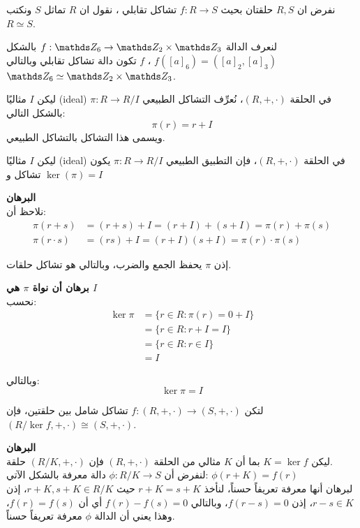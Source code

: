\begin{definition}
	نفرض ان $R, S$ حلقتان بحيث $f:R\to S$ تشاكل تقابلي ، نقول ان $R$ تماثل $S$ ونكتب $R\simeq S$.
\end{definition}

\begin{example}
لنعرف الدالة 
$f : \Z_6\to \Z_2\times \Z_3$ بالشكل 
$f([a]_6) = ([a]_2, [a]_3)$ ، $f$ تكون دالة تشاكل تقابلي وبالتالي $\Z_6 \simeq\Z_2\times \Z_3$.
\end{example}

\begin{definition}
	ليكن $I$ مثاليًا (ideal) في الحلقة $(R, +, \cdot)$، نُعرِّف التشاكل الطبيعي 
	$\pi : R \to R/I$ بالشكل التالي:
	\[
	\pi(r) = r + I
	\]
	ويسمى هذا التشاكل {بالتشاكل الطبيعي}.
\end{definition}
\begin{theorem}
	ليكن $I$ مثاليًا (ideal) في الحلقة $(R, +, \cdot)$، فإن التطبيق الطبيعي 
$\pi : R \to R/I$ 
يكون تشاكل و 
$\ker(\pi) = I$
\end{theorem}
\noindent
\textbf{البرهان}\\
\noindent
نلاحظ أن:
\begin{align*}
	\pi(r + s) &= (r + s) + I = (r + I) + (s + I) = \pi(r) + \pi(s)\\
	\pi(r \cdot s) &= (rs) + I = (r + I)(s + I) = \pi(r) \cdot \pi(s)
\end{align*}

إذن $\pi$ يحفظ الجمع والضرب، وبالتالي هو تشاكل حلقات.

\bigskip

\noindent
\textbf{برهان أن نواة $\pi$ هي $I$}\\
\noindent
نحسب:
\begin{align*}
	\ker \pi &= \{r \in R : \pi(r) = 0 + I\}\\
	&= \{r \in R : r + I = I\}\\
	&= \{r \in R : r \in I\}\\
	&= I
\end{align*}

وبالتالي:
\[
\ker \pi = I
\]


\begin{theorem}
	لتكن 
	$f : (R, +, \cdot) \to (S, +, \cdot)$ تشاكل شامل بين حلقتين، فإن 
	$(R/\ker f, +, \cdot) \cong (S, +, \cdot)$.
\end{theorem}
\noindent
\textbf{البرهان}\\
\noindent
ليكن $K = \ker f$ بما أن 
$K$ مثالي من الحلقة $(R, +, \cdot)$ فإن 
$(R/K, +, \cdot)$ حلقة.\\
لنفرض أن $\phi : R/K \to S$ دالة معرفة بالشكل الآتي: 
$\phi(r + K) = f(r)$\\
لبرهان أنها معرفة تعريفاً حسناً، لنأخذ $r + K = s + K$ حيث 
$r + K, s + K \in R/K$، إذن $r - s \in K$، إذن 
$f(r - s) = 0$، وبالتالي 
$f(r) - f(s) = 0$ أي أن $f(r) = f(s)$، وهذا يعني أن الدالة $\phi$ معرفة تعريفاً حسناً.

